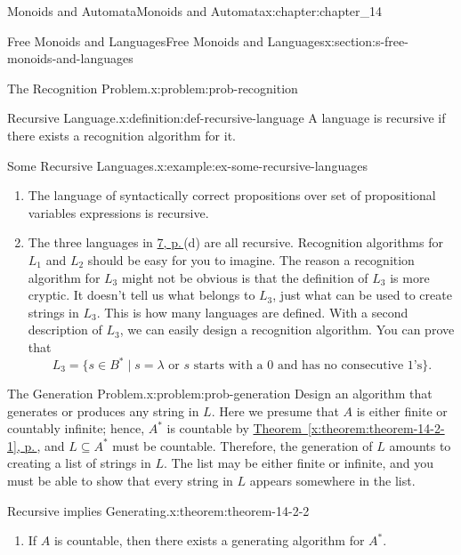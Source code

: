 \documentclass[twoside,10pt,]{book}
\newcommand{\xreffont}{\relax}
\numberwithin{equation}{section}
\begin{document}
\begin{chapterptx}{Monoids and Automata}{}{Monoids and Automata}{}{}{x:chapter:chapter_14}
\begin{sectionptx}{Free Monoids and Languages}{}{Free Monoids and Languages}{}{}{x:section:s-free-monoids-and-languages}
\begin{problem}{The Recognition Problem.}{x:problem:prob-recognition}
\end{problem}
\begin{definition}{Recursive Language.}{x:definition:def-recursive-language}%
%
A language is recursive if there exists a recognition algorithm for it.%
\end{definition}
\begin{example}{Some Recursive Languages.}{x:example:ex-some-recursive-languages}%
%
\begin{enumerate}[label=(\alph*)]
\item{}The language of syntactically correct propositions over set of propositional variables expressions is recursive.%
\item{}The three languages in \hyperref[x:example:ex-some-formal-languages]{7, p.\,\pageref{x:example:ex-some-formal-languages}}(d)  are all recursive. Recognition algorithms for \(L_1\) and \(L_2\) should be easy for you to imagine.  The reason a recognition algorithm for \(L_3\) might not be obvious is that the definition of \(L_3\)  is more cryptic. It doesn't tell us what belongs to \(L_3\), just what can be used to create strings in \(L_3\). This is how many languages are defined. With a second description of \(L_3\), we can easily design a recognition algorithm. You can prove that%
\begin{equation*}
L_3=\{s\in B^* \mid s=\lambda  \textrm{ or }  s \textrm{ starts with a 0 and has no consecutive 1's}\}\text{.}
\end{equation*}
%
\end{enumerate}
%
\end{example}
\begin{problem}{The Generation Problem.}{x:problem:prob-generation}%
Design an algorithm that generates or produces any string in \(L\). Here we presume that \(A\) is either finite or countably infinite; hence, \(A^*\)  is countable by \hyperref[x:theorem:theorem-14-2-1]{Theorem~{\xreffont\ref{x:theorem:theorem-14-2-1}}, p.\,\pageref{x:theorem:theorem-14-2-1}}, and \(L \subseteq A^*\) must be countable. Therefore, the generation of \(L\) amounts to creating a list of strings in \(L\). The list may be either finite or infinite, and you must be able to show that every string in \(L\) appears somewhere in the list.%
\end{problem}
\begin{theorem}{Recursive implies Generating.}{}{x:theorem:theorem-14-2-2}%
%
\begin{enumerate}[label=(\alph*)]
\item{}If \(A\) is countable, then there exists a generating algorithm for \(A^*\).%

\end{enumerate}
\end{theorem}
\end{sectionptx}
\end{chapterptx}
\end{document}
